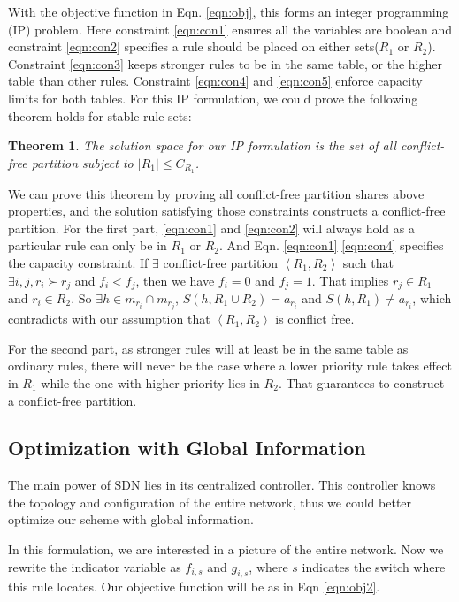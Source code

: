 \documentclass[10pt,twocolumn,letterpaper]{article}
\newtheorem{theorem}{Theorem}
\begin{document}
With the objective function in Eqn. \ref{eqn:obj}, this forms an integer programming (IP) problem. Here constraint \ref{eqn:con1} ensures all the variables are boolean and constraint \ref{eqn:con2} specifies a rule should be placed on either sets($R_1$ or $R_2$). Constraint \ref{eqn:con3} keeps stronger rules to be in the same table, or the higher table than other rules. Constraint \ref{eqn:con4} and \ref{eqn:con5} enforce capacity limits for both tables. For this IP formulation, we could prove the following theorem holds for stable rule sets:

\begin{theorem}
The solution space for our IP formulation is the set of all conflict-free partition subject to $|R_1|\leq C_{R_1}$. 
\end{theorem}

We can prove this theorem by proving all conflict-free partition shares above properties, and the solution satisfying those constraints constructs a conflict-free partition. For the first part, \ref{eqn:con1} and \ref{eqn:con2} will always hold as a particular rule can only be in $R_1$ or $R_2$. And Eqn. \ref{eqn:con1} \ref{eqn:con4} specifies the capacity constraint. If $\exists$ conflict-free partition $\left<R_1,R_2\right>$ such that $\exists i,j, r_i \succ r_j$ and $f_i<f_j$, then we have $f_i=0$ and $f_j=1$. That implies $r_j \in R_1$ and $r_i \in R_2$. So $\exists h\in m_{r_i}\cap m_{r_j}$, $S(h,R_1 \cup R_2)=a_{r_i}$ and $S(h,R_1) \neq a_{r_i}$, which contradicts with our assumption that $\left<R_1,R_2\right>$ is conflict free.

For the second part, as stronger rules will at least be in the same table as ordinary rules, there will never be the case where a lower priority rule takes effect in $R_1$ while the one with higher priority lies in $R_2$. That guarantees to construct a conflict-free partition.

\subsection{Optimization with Global Information}
The main power of SDN lies in its centralized controller. This controller knows the topology and configuration of the entire network, thus we could better optimize our scheme with global information. 

In this formulation, we are interested in a picture of the entire network. Now we rewrite the indicator variable as $f_{i,s}$ and $g_{i,s}$, where $s$ indicates the switch where this rule locates. Our objective function will be as in Eqn \ref{eqn:obj2}.
\end{document}
